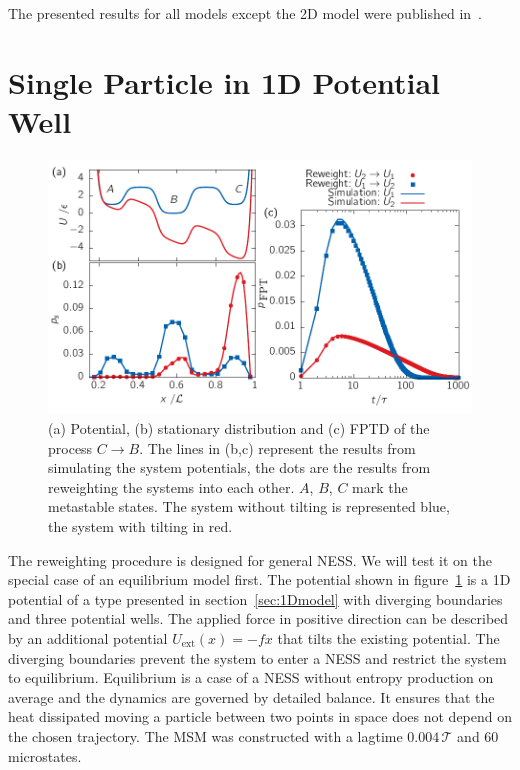 The presented results for all models except the 2D model were published in~\cite{bause2019microscopic}.


\section{Single Particle in 1D Potential Well}
\label{sec:equ}
\begin{figure}[h]
\centering
 \includegraphics{../plots/Urew/single_3003.pdf}
 \caption[Potential surface, stationary distribution and first-passage time distribution of a chosen process for the 1D equilibrium system]{ (a) Potential, (b) stationary distribution and (c) FPTD of the process $ C \rightarrow B$. The lines in (b,c) represent the results from simulating the system potentials, the dots are the results from reweighting the systems into each other. $A$, $B$, $C$ mark the metastable states. The system without tilting is represented blue, the system with tilting in red. }
 \label{fig:potequ} 
\end{figure}

The reweighting procedure is designed for general NESS. We will test it on the special case of an equilibrium model first. The potential shown in figure~\ref{fig:potequ} is a 1D potential of a type presented in section~\ref{sec:1Dmodel} with diverging boundaries and three potential wells. 
The applied force in positive direction can be described by an additional potential $U_{\text{ext}}(x) = -f x $ that tilts the existing potential. The diverging boundaries prevent the system to enter a NESS and restrict the system to equilibrium. Equilibrium is a case of a NESS without entropy production on average and the dynamics are governed by detailed balance. It ensures that the heat dissipated moving a particle between two points in space does not depend on the chosen trajectory. The MSM was constructed with a lagtime $0.004\,\mathcal{T}$ and $60$ microstates. 
 
